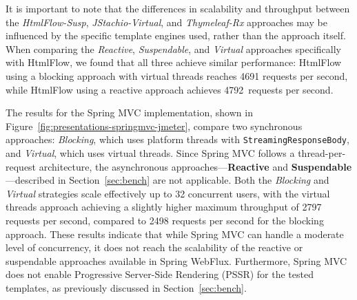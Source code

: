 \documentclass[software,article,accept,pdftex,moreauthors]{Definitions/mdpi}
\begin{document}
It is important to note that the differences in scalability and throughput
between the \textit{HtmlFlow-Susp}, \textit{JStachio-Virtual}, and
\textit{Thymeleaf-Rx} approaches may be influenced by the specific template
engines used, rather than the approach itself. When comparing the
\textit{Reactive}, \textit{Suspendable}, and \textit{Virtual} approaches
specifically with HtmlFlow, we found that all three achieve similar
performance: HtmlFlow using a blocking approach with virtual threads reaches
4691 requests per second, while HtmlFlow using a reactive approach achieves
4792~requests per second.



The results for the Spring MVC implementation, shown in
Figure~\ref{fig:presentations-springmvc-jmeter}, compare two synchronous
approaches: \textit{Blocking}, which uses platform threads with
\texttt{StreamingResponseBody}, and \textit{Virtual}, which uses virtual
threads. Since Spring MVC follows a thread-per-request architecture, the
asynchronous approaches---\textbf{Reactive} and \textbf{Suspendable}---described in
Section~\ref{sec:bench} are not applicable. Both the \textit{Blocking} and
\textit{Virtual} strategies scale effectively up to 32 concurrent users, with
the virtual threads approach achieving a slightly higher maximum throughput of
2797 requests per second, compared to 2498 requests per second for the
blocking approach. These results indicate that while Spring MVC can handle a
moderate level of concurrency, it does not reach the scalability of the
reactive or suspendable approaches available in Spring WebFlux. Furthermore,
Spring MVC does not enable Progressive Server-Side Rendering (PSSR) for the
tested templates, as previously discussed in Section~\ref{sec:bench}.
\end{document}
